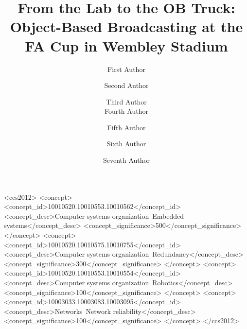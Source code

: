 \documentclass[sigchi-a, authorversion]{acmart}
\begin{document}
\title{From the Lab to the OB Truck: Object-Based Broadcasting at the FA Cup in Wembley Stadium}

\author{First Author}

\author{Second Author}

\author{Third Author \\
  Fourth Author}

\author{Fifth Author}

\author{Sixth Author}

\author{Seventh Author}

\renewcommand{\shortauthors}{F. Author et al.}


%
%
\begin{CCSXML}
<ccs2012>
 <concept>
  <concept_id>10010520.10010553.10010562</concept_id>
  <concept_desc>Computer systems organization~Embedded systems</concept_desc>
  <concept_significance>500</concept_significance>
 </concept>
 <concept>
  <concept_id>10010520.10010575.10010755</concept_id>
  <concept_desc>Computer systems organization~Redundancy</concept_desc>
  <concept_significance>300</concept_significance>
 </concept>
 <concept>
  <concept_id>10010520.10010553.10010554</concept_id>
  <concept_desc>Computer systems organization~Robotics</concept_desc>
  <concept_significance>100</concept_significance>
 </concept>
 <concept>
  <concept_id>10003033.10003083.10003095</concept_id>
  <concept_desc>Networks~Network reliability</concept_desc>
  <concept_significance>100</concept_significance>
 </concept>
</ccs2012>
\end{CCSXML}
\end{document}
